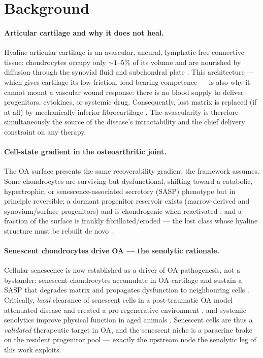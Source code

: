 \documentclass[11pt,a4paper]{article}
\begin{document}
\section{Background}
\label{sec:bg}
\paragraph{Articular cartilage and why it does not heal.} Hyaline articular cartilage is
an avascular, aneural, lymphatic-free connective tissue: chondrocytes occupy only
${\sim}1$--$5\%$ of its volume and are nourished by diffusion through the synovial fluid
and subchondral plate \citep{sophia2009}. This architecture --- which gives cartilage its
low-friction, load-bearing competence --- is also why it cannot mount a vascular wound
response: there is no blood supply to deliver progenitors, cytokines, or systemic drug.
Consequently, lost matrix is replaced (if at all) by mechanically inferior fibrocartilage
\citep{makris2015}. The avascularity is therefore simultaneously the source of the
disease's intractability and the chief delivery constraint on any therapy.

\paragraph{Cell-state gradient in the osteoarthritic joint.} The OA surface presents the
same recoverability gradient the framework assumes. Some chondrocytes are
surviving-but-dysfunctional, shifting toward a catabolic, hypertrophic, or
senescence-associated secretory (SASP) phenotype but in principle reversible; a dormant
progenitor reservoir exists (marrow-derived and synovium/surface progenitors) and is
chondrogenic when reactivated \citep{johnstone1998}; and a fraction of the surface is
frankly fibrillated/eroded --- the lost class whose hyaline structure must be rebuilt de
novo \citep{loeser2016}.

\paragraph{Senescent chondrocytes drive OA --- the senolytic rationale.} Cellular
senescence is now established as a driver of OA pathogenesis, not a bystander: senescent
chondrocytes accumulate in OA cartilage and sustain a SASP that degrades matrix and
propagates dysfunction to neighbouring cells \citep{coryell2021,loeser2016}. Critically,
\emph{local} clearance of senescent cells in a post-traumatic OA model attenuated disease
and created a pro-regenerative environment \citep{jeon2017}, and systemic senolytics
improve physical function in aged animals \citep{xu2018}. Senescent cells are thus a
\emph{validated} therapeutic target in OA, and the senescent niche is a paracrine brake
on the resident progenitor pool --- exactly the upstream node the senolytic leg of this
work exploits.
\end{document}
